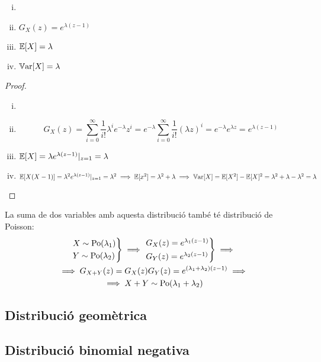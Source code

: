 \begin{prop}
    \begin{enumerate}[i)]
        \item[]
        \item $G_X(z) = e^{\lambda(z-1)}$
        \item $\operatorname{\mathbb{E}}[X] = \lambda$
        \item $\operatorname{\mathbb{V}ar}[X] = \lambda$
    \end{enumerate}
\end{prop}

\begin{proof}
    \begin{enumerate}[i)]
        \item[]
        \item \[G_X(z) = \sum_{i=0}^\infty \frac{1}{i!}\lambda^i e^{-\lambda} z^i =
            e^{-\lambda} \sum_{i=0}^\infty \frac{1}{i!}(\lambda z)^i = e^{-\lambda}e^{\lambda z} = e^{\lambda(z-1)}\]
        \item $\operatorname{\mathbb{E}}[X] = \lambda e^{\lambda(z-1)}|_{z=1} = \lambda$
        \item $\operatorname{\mathbb{E}}[X(X-1)] = \lambda^2 e^{\lambda(z-1)}|_{z=1} = \lambda^2 \implies \operatorname{\mathbb{E}}[x^2] = \lambda^2+\lambda \implies
         \operatorname{\mathbb{V}ar}[X] = \operatorname{\mathbb{E}}[X^2] - \operatorname{\mathbb{E}}[X]^2 = \lambda^2 + \lambda - \lambda^2 = \lambda$
    \end{enumerate}
\end{proof}

\begin{obs} La suma de dos variables amb aquesta distribució també té distribució de Poisson:
    \begin{gather*}
    \begin{rcases*} X \sim \mathrm{Po}(\lambda_1) \\ Y \sim \mathrm{Po}(\lambda_2) \end{rcases*} \implies
    \begin{rcases*} G_X(z) = e^{\lambda_1(z-1)} \\ G_Y(z) = e^{\lambda_2(z-1)} \end{rcases*}
    \implies \\
    \implies G_{X+Y}(z) = G_X(z)G_Y(z) = e^{(\lambda_1+\lambda_2)(z-1)} \implies \\
    \implies X+Y \sim \mathrm{Po}(\lambda_1+\lambda_2)
    \end{gather*}
\end{obs}

\subsection*{Distribució geomètrica}


\subsection*{Distribució binomial negativa}

